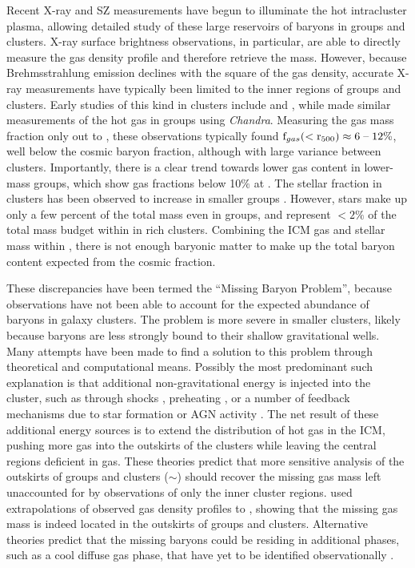 Recent X-ray and SZ measurements have begun to illuminate the hot
intracluster plasma, allowing detailed study of these large reservoirs
of baryons in groups and clusters. X-ray surface brightness
observations, in particular, are able to directly measure the gas
density profile and therefore retrieve the mass. However, because
Brehmsstrahlung emission declines with the square of the gas density,
accurate X-ray measurements have typically been limited to the inner
regions of groups and clusters. Early studies of this kind in clusters
include \citet[][with \textit{Chandra}]{Vikhlinin2006} and
\citet[][with \textit{XMM-Newton}]{Arnaud2007}, while \citet{Sun2009}
made similar measurements of the hot gas in groups using
\textit{Chandra}. Measuring the gas mass fraction only out to
\rfive{}, these observations typically found $\textrm{f\ensuremath{_{gas}}}{}(<\textrm{r\ensuremath{_{500}}}{}) \approx
6\;\textrm{--}\;12\%$, well below the cosmic baryon fraction, although with
large variance between clusters. Importantly, there is a clear trend
towards lower gas content in lower-mass groups, which show gas
fractions below 10$\%{}$ at \rfive{}. The stellar fraction in clusters
has been observed to increase in smaller groups \citep{Giodini2009,
  Bahcall2014}. However, stars make up only a few percent of the total
mass even in groups, and represent $<2\%$ of the total mass budget
within \rfive{} in rich clusters. Combining the ICM gas and stellar
mass within \rfive{}, there is not enough baryonic matter to make up
the total baryon content expected from the cosmic fraction.



These discrepancies have been termed the ``Missing Baryon Problem'',
because observations have not been able to account for the expected
abundance of baryons in galaxy clusters. The problem is more severe in
smaller clusters, likely because baryons are less strongly bound to
their shallow gravitational wells. Many attempts have been made to
find a solution to this problem through theoretical and computational
means. Possibly the most predominant such explanation is that
additional non-gravitational energy is injected into the cluster, such
as through shocks \citep{Takizawa1998}, preheating \citep{Bialek2001},
or a number of feedback mechanisms due to star formation or AGN
activity \citep{Metzler1994, McCarthy2007, Bode2009}. The net result
of these additional energy sources is to extend the distribution of
hot gas in the ICM, pushing more gas into the outskirts of the
clusters while leaving the central regions deficient in gas. These
theories predict that more sensitive analysis of the outskirts of
groups and clusters ($\sim$\rvir{}) should recover the missing gas
mass left unaccounted for by observations of only the inner cluster
regions. \citet{Rasheed2011} used extrapolations of observed gas
density profiles to \rvir{}, showing that the missing gas mass is
indeed located in the outskirts of groups and clusters. Alternative
theories predict that the missing baryons could be residing in
additional phases, such as a cool diffuse gas phase, that have yet to
be identified observationally \citep{Afshordi2007, Bonamente2005}.

